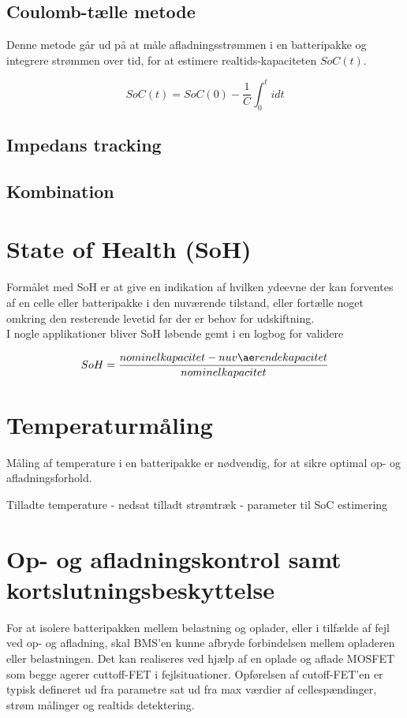 \subsection{Coulomb-tælle metode}
Denne metode går ud på at måle afladningsstrømmen i en batteripakke og integrere strømmen over tid, for at estimere realtids-kapaciteten $SoC(t)$. 


\begin {equation} 
SoC(t) = SoC(0) - \frac{1}{C} \int_{0}^{t} idt  \label{eq:coulomb-count}
\end {equation}






\subsection{Impedans tracking}

\subsection{Kombination}






\section{State of Health (SoH)}
Formålet med SoH er at give en indikation af hvilken ydeevne der kan forventes af en celle eller batteripakke i den nuværende tilstand, eller fortælle noget omkring den resterende levetid før der er behov for udskiftning.
\\
I nogle applikationer bliver SoH løbende gemt i en logbog for validere

\begin {equation} 
SoH = \frac{nominel \space kapacitet - nuværende  kapacitet}{nominel kapacitet} \label{eq:soh}
\end {equation}






\section{Temperaturmåling}
Måling af temperature i en batteripakke er nødvendig, for at sikre optimal op- og afladningsforhold. 

Tilladte temperature - nedsat tilladt strømtræk - parameter til SoC estimering


\section{Op- og afladningskontrol samt kortslutningsbeskyttelse}
For at isolere batteripakken mellem belastning og oplader, eller i tilfælde af fejl ved op- og afladning, skal BMS'en kunne afbryde forbindelsen mellem opladeren eller belastningen. Det kan realiseres ved hjælp af en oplade og aflade MOSFET som begge agerer cuttoff-FET i fejlsituationer. Opførelsen af cutoff-FET'en er typisk defineret ud fra parametre sat ud fra max værdier af cellespændinger, strøm målinger og realtids detektering. 
\\

